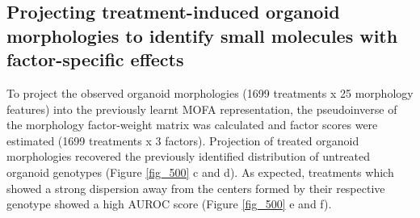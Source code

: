 \begin{flushleft}
\newpage
\section{Projecting treatment-induced organoid morphologies to identify small molecules with factor-specific effects}









To project the observed organoid morphologies (1699 treatments x 25 morphology features) into the previously learnt MOFA representation, the pseudoinverse of the morphology factor-weight matrix was calculated and factor scores were estimated (1699 treatments x 3 factors). Projection of treated organoid morphologies recovered the previously identified distribution of untreated organoid genotypes (Figure \ref{fig_500} c and d). As expected, treatments which showed a strong dispersion away from the centers formed by their respective genotype showed a high AUROC score (Figure \ref{fig_500} e and f).
\bigbreak


\end{flushleft}
